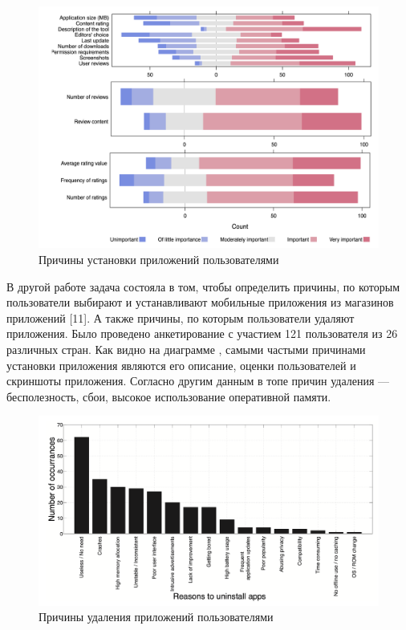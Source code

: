 \documentclass[a4paper,14pt]{extarticle} %
\begin{document}
	\begin{figure}[h]
		\includegraphics[width=\textwidth]{install_reasons}
		\caption{Причины установки приложений пользователями}
		\label{fig:install_reasons}
	\end{figure}
	
	В другой работе задача состояла в том, чтобы определить причины, по которым пользователи выбирают и устанавливают мобильные приложения из магазинов приложений [11]. А также причины, по которым пользователи удаляют приложения. Было проведено анкетирование с участием 121 пользователя из 26 различных стран. Как видно на диаграмме \ris{\ref{fig:install_reasons}}, самыми частыми причинами установки приложения являются его описание, оценки пользователей и скриншоты приложения. Согласно другим данным \ris{\ref{fig:delete_reasons}} в топе причин удаления — бесполезность, сбои, высокое использование оперативной памяти.
	
	\begin{figure}[h]
		\includegraphics[width=\textwidth]{delete_reasons}
		\caption{Причины удаления приложений пользователями}
		\label{fig:delete_reasons}
	\end{figure}
	
\end{document}
